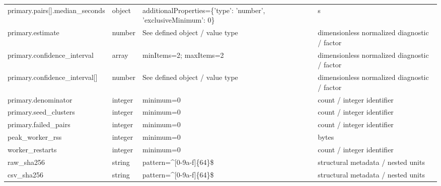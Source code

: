 \begin{longtable}{@{}>{\raggedright\arraybackslash}p{}>{\raggedright\arraybackslash}p{}>{\raggedright\arraybackslash}p{}>{\raggedright\arraybackslash}p{}@{}}
primary.\allowbreak{}pairs[].\allowbreak{}median\_\allowbreak{}seconds & object & additionalProperties=\allowbreak{}\{'type': 'number', 'exclusiveMinimum': 0\} & s\\
primary.\allowbreak{}estimate & number & See defined object /\allowbreak{} value type & dimensionless normalized diagnostic /\allowbreak{} factor\\
primary.\allowbreak{}confidence\_\allowbreak{}interval & array & minItems=\allowbreak{}2; maxItems=\allowbreak{}2 & dimensionless normalized diagnostic /\allowbreak{} factor\\
primary.\allowbreak{}confidence\_\allowbreak{}interval[] & number & See defined object /\allowbreak{} value type & dimensionless normalized diagnostic /\allowbreak{} factor\\
primary.\allowbreak{}denominator & integer & minimum=\allowbreak{}0 & count /\allowbreak{} integer identifier\\
primary.\allowbreak{}seed\_\allowbreak{}clusters & integer & minimum=\allowbreak{}0 & count /\allowbreak{} integer identifier\\
primary.\allowbreak{}failed\_\allowbreak{}pairs & integer & minimum=\allowbreak{}0 & count /\allowbreak{} integer identifier\\
peak\_\allowbreak{}worker\_\allowbreak{}rss & integer & minimum=\allowbreak{}0 & bytes\\
worker\_\allowbreak{}restarts & integer & minimum=\allowbreak{}0 & count /\allowbreak{} integer identifier\\
raw\_\allowbreak{}sha256 & string & pattern=\allowbreak{}\textasciicircum{}[0-9a-\allowbreak{}f]\{64\}\$ & structural metadata /\allowbreak{} nested units\\
csv\_\allowbreak{}sha256 & string & pattern=\allowbreak{}\textasciicircum{}[0-9a-\allowbreak{}f]\{64\}\$ & structural metadata /\allowbreak{} nested units\\
\end{longtable}\endgroup

